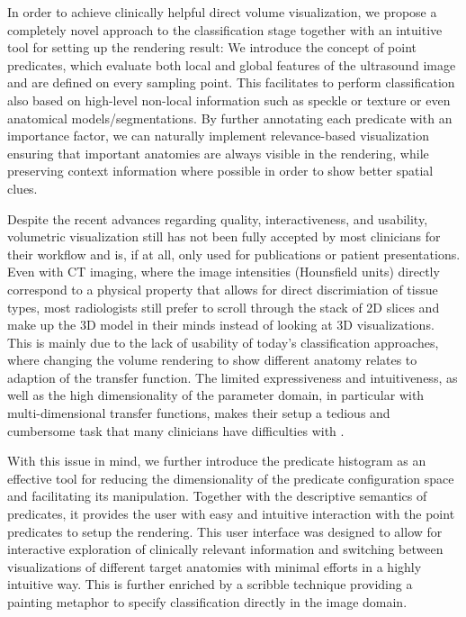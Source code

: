 In order to achieve clinically helpful direct volume visualization, we propose a completely novel approach to the classification stage together with an intuitive tool for setting up the rendering result: We introduce the concept of point predicates, which evaluate both local and global features of the ultrasound image and are defined on every sampling point. 
This facilitates to perform classification also based on high-level non-local information such as speckle or texture or even anatomical models/segmentations. 
By further annotating each predicate with an importance factor, we can naturally implement relevance-based visualization ensuring that important anatomies are always visible in the rendering, while preserving context information where possible in order to show better spatial clues. 

Despite the recent advances regarding quality, interactiveness, and usability, volumetric visualization still has not been fully accepted by most clinicians for their workflow and is, if at all, only used for publications or patient presentations. 
Even with CT imaging, where the image intensities (Hounsfield units) directly correspond to a physical property that allows for direct discrimiation of tissue types, most radiologists still prefer to scroll through the stack of 2D slices and make up the 3D model in their minds instead of looking at 3D visualizations.
This is mainly due to the lack of usability of today's classification approaches, where changing the volume rendering to show different anatomy relates to adaption of the transfer function.
The limited expressiveness and intuitiveness, as well as the high dimensionality of the parameter domain, in particular with multi-dimensional transfer functions, makes their setup a tedious and cumbersome task that many clinicians have difficulties with \cite{Salama06}. 

With this issue in mind, we further introduce the predicate histogram as an effective tool for reducing the dimensionality of the predicate configuration space and facilitating its manipulation. 
Together with the descriptive semantics of predicates, it provides the user with easy and intuitive interaction with the point predicates to setup the rendering. 
This user interface was designed to allow for interactive exploration of clinically relevant information and switching between visualizations of different target anatomies with minimal efforts in a highly intuitive way.
This is further enriched by a scribble technique providing a painting metaphor to specify classification directly in the image domain. 


